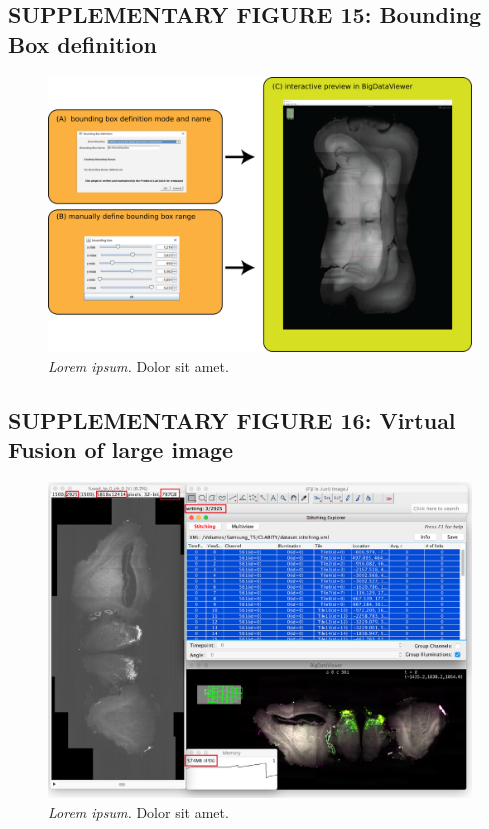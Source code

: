 \documentclass[]{spie}  %
\begin{document}
\pagebreak

\subsection*{SUPPLEMENTARY FIGURE 15: Bounding Box definition}
\vspace{1mm}
\begin{figure}[h!]
\includegraphics[width=\textwidth]{Supp-BB.png}
\vspace{-2.0mm}
\caption{\hspace{-0.5mm} \emph{Lorem ipsum.} Dolor sit amet.
}
\label{fig:sup-fig-boundingbox}
\end{figure}

\pagebreak


\subsection*{SUPPLEMENTARY FIGURE 16: Virtual Fusion of large image}
\vspace{1mm}
\begin{figure}[h!]
\includegraphics[width=\textwidth]{fig-fusion-screenshot.png}
\vspace{-2.0mm}
\caption{\hspace{-0.5mm} \emph{Lorem ipsum.} Dolor sit amet.
}
\label{fig:sup-fig-fusion}
\end{figure}
\end{document}
